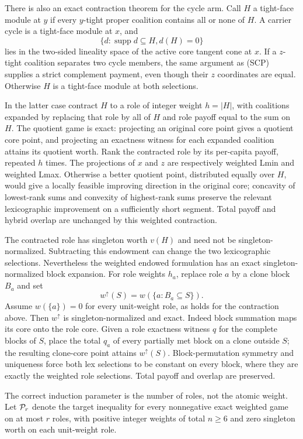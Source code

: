 \documentclass[11pt]{article}
\begin{document}
There is also an exact contraction theorem for the cycle arm.  Call
$H$ a tight-face module at $y$ if every $y$-tight proper coalition contains
all or none of $H$.  A carrier cycle is a tight-face module at $x$, and
\[
 \{d:\operatorname{supp}d\subseteq H, d(H)=0\}
\]
lies in the two-sided lineality space of the active core tangent cone at
$x$.  If a $z$-tight coalition separates two cycle members, the same argument
as (SCP) supplies a strict complement payment, even though their $z$
coordinates are equal.  Otherwise $H$ is a tight-face module at both
selections.

In the latter case contract $H$ to a role of integer weight $h=|H|$, with
coalitions expanded by replacing that role by all of $H$ and role payoff
equal to the sum on $H$.  The quotient game is exact: projecting an original
core point gives a quotient core point, and projecting an exactness witness
for each expanded coalition attains its quotient worth.  Rank the contracted
role by its per-capita payoff, repeated $h$ times.  The projections of $x$
and $z$ are respectively weighted Lmin and weighted Lmax.  Otherwise a
better quotient point, distributed equally over $H$, would give a locally
feasible improving direction in the original core; concavity of lowest-rank
sums and convexity of highest-rank sums preserve the relevant lexicographic
improvement on a sufficiently short segment.  Total payoff and hybrid
overlap are unchanged by this weighted contraction.

The contracted role has singleton worth $v(H)$ and need not be
singleton-normalized.  Subtracting this endowment can change the two
lexicographic selections.  Nevertheless the weighted endowed formulation
has an exact singleton-normalized block expansion.  For role weights $h_a$,
replace role $a$ by a clone block $B_a$ and set
\[
 w^\uparrow(S)=w(\{a:B_a\subseteq S\}).              \tag{CBE}
\]
Assume $w(\{a\})=0$ for every unit-weight role, as holds for the contraction
above.  Then $w^\uparrow$ is singleton-normalized and exact.  Indeed block
summation maps its core onto the role core.  Given a role exactness witness
$q$ for the complete blocks of $S$, place the total $q_a$ of every partially
met block on a clone outside $S$; the resulting clone-core point attains
$w^\uparrow(S)$.  Block-permutation symmetry and uniqueness force both lex
selections to be constant on every block, where they are exactly the
weighted role selections.  Total payoff and overlap are preserved.

The correct induction parameter is the number of roles, not the atomic
weight.  Let ${\cal P}_r$ denote the target inequality for every nonnegative
exact weighted game on at most $r$ roles, with positive integer weights of
total $n\ge6$ and zero singleton worth on each unit-weight role.
\end{document}
